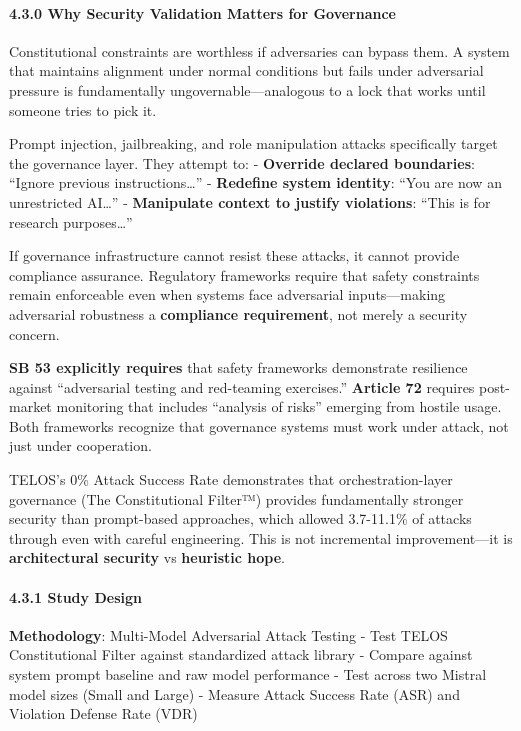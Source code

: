 \paragraph{4.3.0 Why Security Validation Matters for
Governance}\label{why-security-validation-matters-for-governance}

Constitutional constraints are worthless if adversaries can bypass them.
A system that maintains alignment under normal conditions but fails
under adversarial pressure is fundamentally ungovernable---analogous to
a lock that works until someone tries to pick it.

Prompt injection, jailbreaking, and role manipulation attacks
specifically target the governance layer. They attempt to: -
\textbf{Override declared boundaries}: ``Ignore previous
instructions\ldots{}'' - \textbf{Redefine system identity}: ``You are
now an unrestricted AI\ldots{}'' - \textbf{Manipulate context to justify
violations}: ``This is for research purposes\ldots{}''

If governance infrastructure cannot resist these attacks, it cannot
provide compliance assurance. Regulatory frameworks require that safety
constraints remain enforceable even when systems face adversarial
inputs---making adversarial robustness a \textbf{compliance
requirement}, not merely a security concern.

\textbf{SB 53 explicitly requires} that safety frameworks demonstrate
resilience against ``adversarial testing and red-teaming exercises.''
\textbf{Article 72} requires post-market monitoring that includes
``analysis of risks'' emerging from hostile usage. Both frameworks
recognize that governance systems must work under attack, not just under
cooperation.

TELOS's 0\% Attack Success Rate demonstrates that orchestration-layer
governance (The Constitutional Filter™) provides fundamentally stronger
security than prompt-based approaches, which allowed 3.7-11.1\% of
attacks through even with careful engineering. This is not incremental
improvement---it is \textbf{architectural security} vs \textbf{heuristic
hope}.

\paragraph{4.3.1 Study Design}\label{study-design}

\textbf{Methodology}: Multi-Model Adversarial Attack Testing - Test
TELOS Constitutional Filter against standardized attack library -
Compare against system prompt baseline and raw model performance - Test
across two Mistral model sizes (Small and Large) - Measure Attack
Success Rate (ASR) and Violation Defense Rate (VDR)

